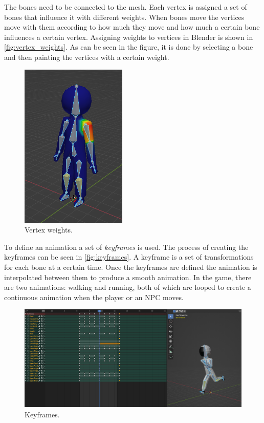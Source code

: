 The bones need to be connected to the mesh.
Each vertex is assigned a set of bones that influence it with different weights.
When bones move the vertices move with them according to how much they move and how much a certain bone influences a certain vertex.
Assigning weights to vertices in Blender is shown in \autoref{fig:vertex_weights}.
As can be seen in the figure, it is done by selecting a bone and then painting the vertices with a certain weight.

\begin{figure}[h]
    \centering
    \includegraphics[width=0.45\textwidth]{chapters/theoretical_foundations/sections/models/resources/WeightPaint.png}
    \caption{Vertex weights.}
    \label{fig:vertex_weights}
\end{figure}

To define an animation a set of \textit{keyframes} is used.
The process of creating the keyframes can be seen in \autoref{fig:keyframes}.
A keyframe is a set of transformations for each bone at a certain time.
Once the keyframes are defined the animation is interpolated between them to produce a smooth animation.
In the game, there are two animations: walking and running, both of which are looped to create a continuous animation when the player or an NPC moves.

\begin{figure}[h]
    \centering
    \includegraphics[width=1\textwidth]{chapters/theoretical_foundations/sections/models/resources/DopeSheet.png}
    \caption{Keyframes.}
    \label{fig:keyframes}
\end{figure}


